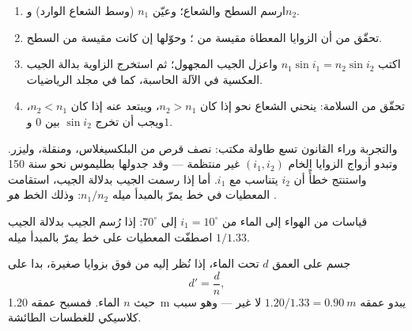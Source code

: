 \begin{method}\label{met:g10:refraction:method}
\begin{enumerate}
  \item ارسم السطح  والشعاع؛ وعيّن $n_1$
        (وسط الشعاع الوارد) و$n_2$.
  \item تحقّق من أن الزوايا المعطاة مقيسة من ؛
        وحوّلها إن كانت مقيسة من السطح.
  \item اكتب $n_1 \sin i_1 = n_2 \sin i_2$ واعزل الجيب
        المجهول؛ ثم استخرج الزاوية بدالة الجيب العكسية في الآلة الحاسبة، كما في
        مجلد الرياضيات.
  \item تحقّق من السلامة: ينحني الشعاع نحو  إذا كان $n_2 > n_1$،
        ويبتعد عنه إذا كان $n_2 < n_1$، ويجب أن تخرج $\sin i_2$
        بين $0$ و$1$.
\end{enumerate}
\end{method}

والتجربة وراء القانون تسع طاولة مكتب: نصف قرص من البلكسيغلاس،
ومنقلة، وليزر. وتبدو أزواج الزوايا الخام $(i_1, i_2)$ غير منتظمة ---
وقد جدولها بطليموس نحو سنة 150 واستنتج خطأً أن
$i_2$ يتناسب مع $i_1$. أما إذا رسمت الجيب بدلالة الجيب،
استقامت المعطيات في خط يمرّ بالمبدأ ميله $n_1/n_2$: وذلك
الخط \emph{هو} .

\begin{omfigure}

{\small قياسات من الهواء إلى الماء من $i_1 = 10^\circ$ إلى $70^\circ$:
إذا رُسم الجيب بدلالة الجيب اصطفّت المعطيات على خط يمرّ بالمبدأ
ميله $1/1.33$.}
\end{omfigure}

\begin{proposition}\label{prop:g10:refraction:depth}
جسم على العمق $d$ تحت الماء، إذا نُظر إليه من فوق بزوايا صغيرة،
بدا على \emph{}
\[
d' = \frac{d}{n} ,
\]
حيث $n$  الماء. فمسبح عمقه \qty{1.20}{m} يبدو
عمقه $1.20/1.33 = \qty{0.90}{m}$ لا غير --- وهو سبب كلاسيكي
للغطسات الطائشة.
\end{proposition}
\admitted

